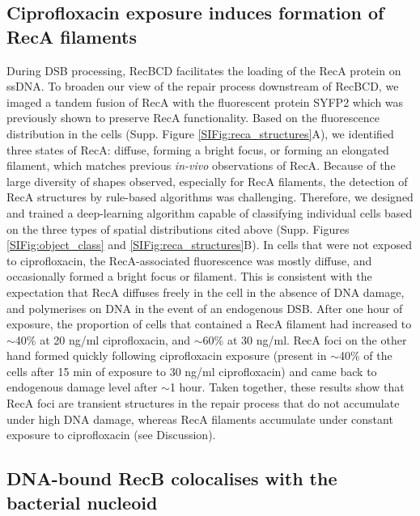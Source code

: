 \subsection*{Ciprofloxacin exposure induces formation of RecA filaments}
During DSB processing, RecBCD facilitates the loading of the RecA protein on ssDNA. To broaden our view of the repair process down\-stream of RecBCD, we imaged a tandem fusion of RecA with the fluorescent protein SYFP2 which was previously shown to preserve RecA functionality\cite{Wiktor2021}. Based on the fluorescence distribution in the cells (Supp. Figure \ref{SIFig:reca_structures}A), we identified three states of RecA: diffuse, forming a bright focus, or forming an elongated filament, which matches previous \emph{in-vivo} observations of RecA\cite{Wiktor2021}. Because of the large diversity of shapes observed, especially for RecA filaments, the detection of RecA structures by rule-based algorithms was challenging. Therefore, we designed and trained a deep-learning algorithm capable of classifying individual cells based on the three types of spatial distributions cited above (Supp. Figures \ref{SIFig:object_class} and \ref{SIFig:reca_structures}B). In cells that were not exposed to ciprofloxacin, the RecA-associated fluorescence was mostly diffuse, and occasionally formed a bright focus or filament. This is consistent with the expectation that RecA diffuses freely in the cell in the absence of DNA damage, and polymerises on DNA in the event of an endogenous DSB. After one hour of exposure, the proportion of cells that contained a RecA filament had increased to $\sim$40\% at 20 ng/ml ciprofloxacin, and $\sim$60\% at 30 ng/ml. RecA foci on the other hand formed quickly following ciprofloxacin exposure (present in $\sim$40\% of the cells after 15 min of exposure to 30 ng/ml ciprofloxacin) and came back to endogenous damage level after $\sim$1 hour. Taken together, these results show that RecA foci are transient structures in the repair process that do not accumulate under high DNA damage, whereas RecA filaments accumulate under constant exposure to ciprofloxacin (see Discussion).

\subsection*{DNA-bound RecB colocalises with the bacterial nucleoid}

